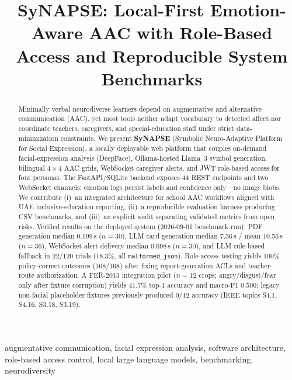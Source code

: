 \documentclass[conference]{IEEEtran}
\begin{document}
\title{SyNAPSE: Local-First Emotion-Aware AAC with Role-Based Access and Reproducible System Benchmarks}

\author{
}

\maketitle

\begin{abstract}
Minimally verbal neurodiverse learners depend on augmentative and alternative communication (AAC), yet most tools neither adapt vocabulary to detected affect nor coordinate teachers, caregivers, and special-education staff under strict data-minimization constraints. We present \textbf{SyNAPSE} (Symbolic Neuro-Adaptive Platform for Social Expression), a locally deployable web platform that couples on-demand facial-expression analysis (DeepFace), Ollama-hosted Llama~3 symbol generation, bilingual $4\times4$ AAC grids, WebSocket caregiver alerts, and JWT role-based access for four personas. The FastAPI/SQLite backend exposes 44 REST endpoints and two WebSocket channels; emotion logs persist labels and confidence only---no image blobs. We contribute (i)~an integrated architecture for school AAC workflows aligned with UAE inclusive-education reporting, (ii)~a reproducible evaluation harness producing CSV benchmarks, and (iii)~an explicit audit separating validated metrics from open risks. Verified results on the deployed system (2026-09-01 benchmark run): PDF generation median 0.199\,s ($n{=}30$), LLM card generation median 7.36\,s / mean 10.56\,s ($n{=}36$), WebSocket alert delivery median 0.698\,s ($n{=}30$), and LLM rule-based fallback in 22/120 trials (18.3\%, all \texttt{malformed\_json}). Role-access testing yields 100\% policy-correct outcomes (168/168) after fixing report-generation ACLs and teacher-route authorization. A FER-2013 integration pilot ($n{=}12$ crops; angry/disgust/fear only after fixture corruption) yields 41.7\% top-1 accuracy and macro-F1 0.500; legacy non-facial placeholder fixtures previously produced 0/12 accuracy (IEEE topics S4.1, S4.16, S3.18, S3.19).
\end{abstract}

\begin{IEEEkeywords}
augmentative communication, facial expression analysis, software architecture, role-based access control, local large language models, benchmarking, neurodiversity
\end{IEEEkeywords}
\end{document}
